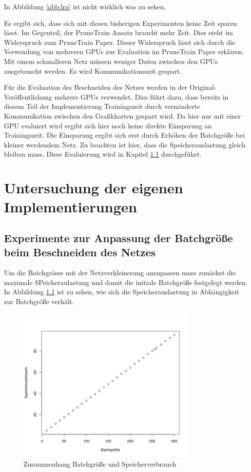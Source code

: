  In Abbildung \ref{abb:lra} ist nicht wirklich was zu sehen, 
 
 
 
Es ergibt sich, dass sich mit diesen bisherigen Experimenten keine Zeit sparen lässt. Im Gegenteil, der PruneTrain Ansatz braucht mehr Zeit. Dies steht im Widerspruch zum PruneTrain Paper. Dieser Widerspruch lässt sich durch die Verwendung von mehreren GPUs zur Evaluation im PruneTrain Paper erklären. Mit einem schmalleren Netz müssen weniger Daten zwischen den GPUs ausgetauscht werden. Es wird Kommunikationszeit gespart.


\color{blue1}
Für die Evaluation des Beschneiden des Netzes werden in der Original-Veröffentlichung mehrere GPUs verwendet. Dies führt dazu, dass bereits in diesem Teil der Implementierung Trainingszeit durch verminderte Kommunikation zwischen den Grafikkarten gespart wird. Da hier nur mit einer GPU evaluiert wird ergibt sich hier noch keine direkte Einsparung an Trainingszeit. Die Einsparung ergibt sich erst durch Erhöhen der Batchgröße bei kleiner werdendem Netz. Zu beachten ist hier, dass die Speicherauslastung gleich bleiben muss. Diese Evaluierung wird in Kapitel \ref{sec:ptnew} durchgeführt.


\chapter{Untersuchung der eigenen Implementierungen}
\section{Experimente zur Anpassung der Batchgröße beim Beschneiden des Netzes}\label{sec:ptnew}
Um die Batchgrösse mit der Netzverkleinerung anzupassen muss zunächst die maximale SPeicheraulastung und damit die initiale Batchgröße festgelegt werden. In Abbildung \ref{abb:memory1} ist zu sehen, wie sich die Speicherauslastung in Abhängigkeit zur Batchgröße verhält.

\begin{figure}[h]
 \centering
 \includegraphics[width=0.8\textwidth]{KapitelPartB/Images/memory1.png}
 \caption{Zusammenhang Batchgröße und Speicherverbrauch}
 \label{abb:memory1}
\end{figure}




